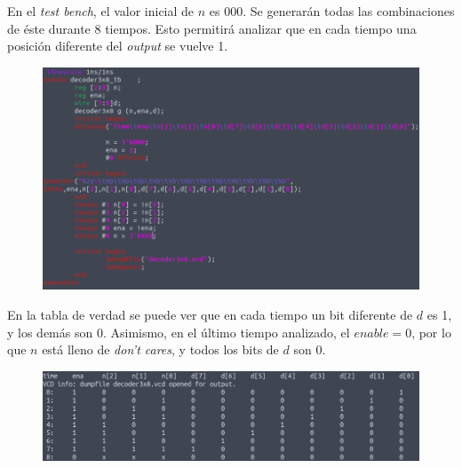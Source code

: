 \documentclass[11pt,a4paper]{article}
\begin{document}
\begin{enumerate}
En el \textit{test bench}, el valor inicial de $n$ es 000. Se generarán todas las combinaciones de éste durante 8 tiempos. Esto permitirá analizar que en cada tiempo una posición diferente del \textit{output} se vuelve 1.
\begin{figure}[h!]
\centering
\includegraphics[scale=0.4]{decoder3x8_2.png} 
\end{figure}

En la tabla de verdad se puede ver que en cada tiempo un bit diferente de $d$ es 1, y los demás son 0. Asimismo, en el último tiempo analizado, el $enable = 0$, por lo que $n$ está lleno de \textit{don't cares}, y todos los bits de $d$ son 0.
\begin{figure}[h!]
\centering
\includegraphics[scale=0.4]{decoder3x8_3.png} 
\end{figure}
\pagebreak


\end{enumerate}
\end{document}
